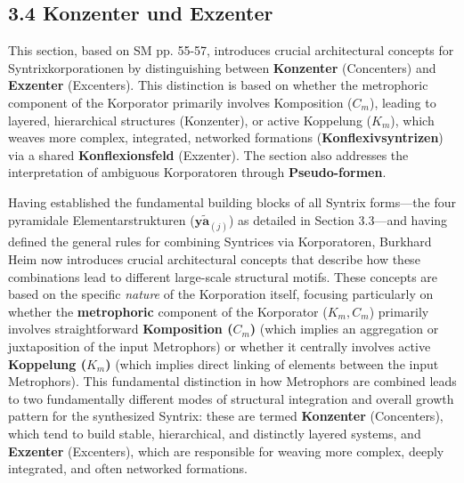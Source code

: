 \documentclass[12pt]{article}
\newcommand{\elementarstruktur}{\bm{y\widetilde{a}}_{(j)}}
\begin{document}
\subsection{3.4 Konzenter und Exzenter}
\label{sec:konzenter_exzenter}

This section, based on SM pp. 55-57, introduces crucial architectural concepts for Syntrixkorporationen by distinguishing between \textbf{Konzenter} (Concenters) and \textbf{Exzenter} (Excenters). This distinction is based on whether the metrophoric component of the Korporator primarily involves Komposition (\(C_m\)), leading to layered, hierarchical structures (Konzenter), or active Koppelung (\(K_m\)), which weaves more complex, integrated, networked formations (\textbf{Konflexivsyntrizen}) via a shared \textbf{Konflexionsfeld} (Exzenter). The section also addresses the interpretation of ambiguous Korporatoren through \textbf{Pseudo-formen}.

Having established the fundamental building blocks of all Syntrix forms—the four pyramidale Elementarstrukturen (\(\elementarstruktur\)) as detailed in Section 3.3—and having defined the general rules for combining Syntrices via Korporatoren, Burkhard Heim now introduces crucial architectural concepts that describe how these combinations lead to different large-scale structural motifs. These concepts are based on the specific \textit{nature} of the Korporation itself, focusing particularly on whether the \textbf{metrophoric} component of the Korporator (\(K_m, C_m\)) primarily involves straightforward \textbf{Komposition (\( C_m \))} (which implies an aggregation or juxtaposition of the input Metrophors) or whether it centrally involves active \textbf{Koppelung (\( K_m \))} (which implies direct linking of elements between the input Metrophors). This fundamental distinction in how Metrophors are combined leads to two fundamentally different modes of structural integration and overall growth pattern for the synthesized Syntrix: these are termed \textbf{Konzenter} (Concenters), which tend to build stable, hierarchical, and distinctly layered systems, and \textbf{Exzenter} (Excenters), which are responsible for weaving more complex, deeply integrated, and often networked formations.
\end{document}
